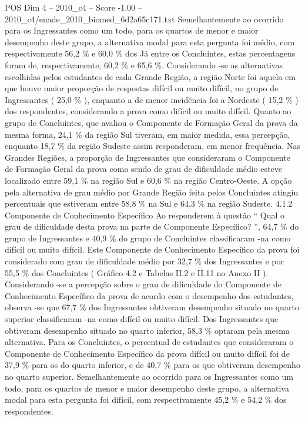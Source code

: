 \begin{textsample}{POS Dim 4 – 2010\_c4 – Score -1.00 – 2010\_c4/enade\_2010\_biomed\_6d2a65c171.txt}
Semelhantemente ao ocorrido para os Ingressantes como um todo, para os quartos de menor e maior desempenho deste grupo, a alternativa modal para esta pergunta foi médio, com respectivamente 56,2 \% e 60,0 \% dos Já entre os Concluintes, estas percentagens foram de, respectivamente, 60,2 \% e 65,6 \%.
Considerando -se as alternativas escolhidas pelos estudantes de cada Grande Região, a região Norte foi aquela em que houve maior proporção de respostas difícil ou muito difícil, no grupo de Ingressantes ( 25,0 \% ), enquanto a de menor incidência foi a Nordeste ( 15,2 \% ) dos respondentes, considerando a prova como difícil ou muito difícil.
Quanto ao grupo de Concluintes, que avaliou o Componente de Formação Geral da prova da mesma forma, 24,1 \% da região Sul tiveram, em maior medida, essa percepção, enquanto 18,7 \% da região Sudeste assim responderam, em menor frequência.
Nas Grandes Regiões, a proporção de Ingressantes que consideraram o Componente de Formação Geral da prova como sendo de grau de dificuldade médio esteve localizado entre 59,1 \% na região Sul e 60,6 \% na região Centro-Oeste.
A opção pela alternativa de grau médio por Grande Região feita pelos Concluintes atingiu percentuais que estiveram entre 58,8 \% na Sul e 64,3 \% na região Sudeste. 4.1.2 Componente de Conhecimento Específico Ao responderem à questão “ Qual o grau de dificuldade desta prova na parte de Componente Específico? ”, 64,7 \% do grupo de Ingressantes e 40,9 \% do grupo de Concluintes classificaram -na como difícil ou muito difícil.
Este Componente de Conhecimento Específico da prova foi considerado com grau de dificuldade médio por 32,7 \% dos Ingressantes e por 55,5 \% dos Concluintes ( Gráfico 4.2 e Tabelas II.2 e II.11 no Anexo II ).
Considerando -se a percepção sobre o grau de dificuldade do Componente de Conhecimento Específico da prova de acordo com o desempenho dos estudantes, observa -se que 67,7 \% dos Ingressantes obtiveram desempenho situado no quarto superior classificaram -na como difícil ou muito difícil.
Dos Ingressantes que obtiveram desempenho situado no quarto inferior, 58,3 \% optaram pela mesma alternativa.
Para os Concluintes, o percentual de estudantes que consideraram o Componente de Conhecimento Específico da prova difícil ou muito difícil foi de 37,9 \% para os do quarto inferior, e de 40,7 \% para os que obtiveram desempenho no quarto superior.
Semelhantemente ao ocorrido para os Ingressantes como um todo, para os quartos de menor e maior desempenho deste grupo, a alternativa modal para esta pergunta foi difícil, com respectivamente 45,2 \% e 54,2 \% dos respondentes.

\end{textsample}
